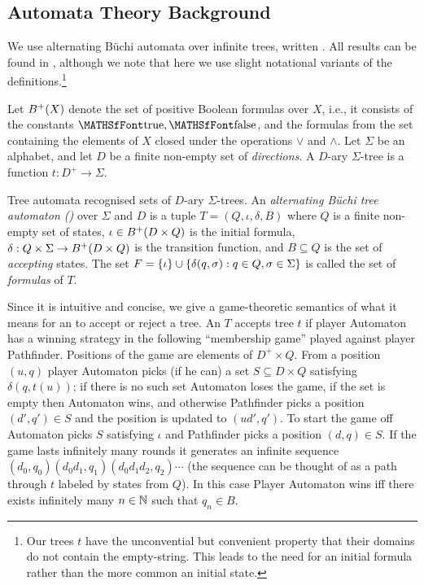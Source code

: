 
\subsection{Automata Theory Background} \label{sec:prelims:automata}

We use alternating B\"uchi automata over infinite trees, written \ABT. All results can be found in \cite{DBLP:conf/dagstuhl/2001automata}, although we note that
here we use slight notational variants of the definitions.\footnote{Our trees $t$ have the unconvential but convenient property that their domains do not contain the empty-string. This leads to the need for an initial formula rather than the more common an initial state.}

Let $B^+(X)$ denote the set of positive Boolean formulas over $X$, i.e., it consists of the constants $\true,\false$, and the formulas from the set containing the elements of $X$ closed under the operations $\vee$ and $\wedge$. Let $\Sigma$ be an alphabet, and let $D$ be a finite non-empty set of \emph{directions}. A $D$-ary $\Sigma$-tree is a function $t:D^+ \to \Sigma$. 


Tree automata recognised sets of $D$-ary $\Sigma$-trees. An \emph{alternating B\"uchi tree automaton (\ABT)} over $\Sigma$ and $D$ is a tuple 
$T = (Q,\iota,\delta,B)$ where $Q$ is a finite non-empty set of states, $\iota \in B^+(D \times Q)$ is the initial formula, 
$\delta:Q \times \Sigma \to B^+(D \times Q)$ is the transition function, and $B \subseteq Q$ is the set of {\em accepting} states. The set $F = \{\iota\} \cup \{\delta(q,\sigma) : q \in Q, \sigma \in \Sigma\}$ is called the set of \emph{formulas} of $T$.

Since it is intuitive and concise, we give a game-theoretic semantics of what it means for an \ABT to accept or reject a tree.
An \ABT $T$ accepts tree $t$ if player Automaton has a winning strategy in the following ``membership game'' played against player Pathfinder. 
Positions of the game are elements of $D^+ \times Q$. From a position $(u,q)$ player Automaton picks (if he can) a set $S \subseteq D \times Q$ satisfying $\delta(q,t(u))$; if there is no such set Automaton loses the game, if the set is empty then Automaton wins, and otherwise Pathfinder picks a position 
$(d',q') \in S$ and the position is updated to $(ud',q')$. To start the game off Automaton picks $S$ satisfying $\iota$ and Pathfinder picks a position $(d,q) \in S$.
If the game lasts infinitely many rounds it generates an infinite sequence $(d_0,q_0) (d_0d_1,q_1) (d_0d_1d_2,q_2) \cdots$ (the sequence can be thought of as a path through $t$ labeled by states from $Q$). In this case Player Automaton wins iff there exists infinitely many $n \in \mathbb{N}$ such that $q_n \in B$. 

